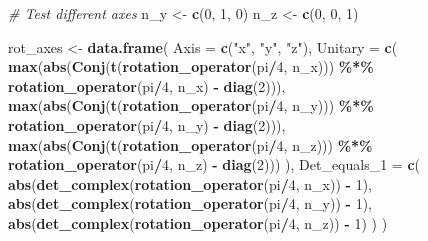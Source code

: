 \documentclass[
]{book}
\newenvironment{Shaded}{\begin{snugshade}}{\end{snugshade}}
\newcommand{\AttributeTok}[1]{\textcolor[rgb]{0.13,0.29,0.53}{#1}}
\newcommand{\CommentTok}[1]{\textcolor[rgb]{0.56,0.35,0.01}{\textit{#1}}}
\newcommand{\DecValTok}[1]{\textcolor[rgb]{0.00,0.00,0.81}{#1}}
\newcommand{\FunctionTok}[1]{\textcolor[rgb]{0.13,0.29,0.53}{\textbf{#1}}}
\newcommand{\NormalTok}[1]{#1}
\newcommand{\OtherTok}[1]{\textcolor[rgb]{0.56,0.35,0.01}{#1}}
\newcommand{\SpecialCharTok}[1]{\textcolor[rgb]{0.81,0.36,0.00}{\textbf{#1}}}
\newcommand{\StringTok}[1]{\textcolor[rgb]{0.31,0.60,0.02}{#1}}
\theoremstyle{definition}
\theoremstyle{definition}
\theoremstyle{definition}
\theoremstyle{definition}
\theoremstyle{remark}
\begin{document}
\begin{Shaded}
\begin{Highlighting}[]
\CommentTok{\# Test different axes}
\NormalTok{n\_y }\OtherTok{\textless{}{-}} \FunctionTok{c}\NormalTok{(}\DecValTok{0}\NormalTok{, }\DecValTok{1}\NormalTok{, }\DecValTok{0}\NormalTok{)}
\NormalTok{n\_z }\OtherTok{\textless{}{-}} \FunctionTok{c}\NormalTok{(}\DecValTok{0}\NormalTok{, }\DecValTok{0}\NormalTok{, }\DecValTok{1}\NormalTok{)}

\NormalTok{rot\_axes }\OtherTok{\textless{}{-}} \FunctionTok{data.frame}\NormalTok{(}
  \AttributeTok{Axis =} \FunctionTok{c}\NormalTok{(}\StringTok{"x"}\NormalTok{, }\StringTok{"y"}\NormalTok{, }\StringTok{"z"}\NormalTok{),}
  \AttributeTok{Unitary =} \FunctionTok{c}\NormalTok{(}
    \FunctionTok{max}\NormalTok{(}\FunctionTok{abs}\NormalTok{(}\FunctionTok{Conj}\NormalTok{(}\FunctionTok{t}\NormalTok{(}\FunctionTok{rotation\_operator}\NormalTok{(pi}\SpecialCharTok{/}\DecValTok{4}\NormalTok{, n\_x))) }\SpecialCharTok{\%*\%} \FunctionTok{rotation\_operator}\NormalTok{(pi}\SpecialCharTok{/}\DecValTok{4}\NormalTok{, n\_x) }\SpecialCharTok{{-}} \FunctionTok{diag}\NormalTok{(}\DecValTok{2}\NormalTok{))),}
    \FunctionTok{max}\NormalTok{(}\FunctionTok{abs}\NormalTok{(}\FunctionTok{Conj}\NormalTok{(}\FunctionTok{t}\NormalTok{(}\FunctionTok{rotation\_operator}\NormalTok{(pi}\SpecialCharTok{/}\DecValTok{4}\NormalTok{, n\_y))) }\SpecialCharTok{\%*\%} \FunctionTok{rotation\_operator}\NormalTok{(pi}\SpecialCharTok{/}\DecValTok{4}\NormalTok{, n\_y) }\SpecialCharTok{{-}} \FunctionTok{diag}\NormalTok{(}\DecValTok{2}\NormalTok{))),}
    \FunctionTok{max}\NormalTok{(}\FunctionTok{abs}\NormalTok{(}\FunctionTok{Conj}\NormalTok{(}\FunctionTok{t}\NormalTok{(}\FunctionTok{rotation\_operator}\NormalTok{(pi}\SpecialCharTok{/}\DecValTok{4}\NormalTok{, n\_z))) }\SpecialCharTok{\%*\%} \FunctionTok{rotation\_operator}\NormalTok{(pi}\SpecialCharTok{/}\DecValTok{4}\NormalTok{, n\_z) }\SpecialCharTok{{-}} \FunctionTok{diag}\NormalTok{(}\DecValTok{2}\NormalTok{)))}
\NormalTok{  ),}
  \AttributeTok{Det\_equals\_1 =} \FunctionTok{c}\NormalTok{(}
    \FunctionTok{abs}\NormalTok{(}\FunctionTok{det\_complex}\NormalTok{(}\FunctionTok{rotation\_operator}\NormalTok{(pi}\SpecialCharTok{/}\DecValTok{4}\NormalTok{, n\_x)) }\SpecialCharTok{{-}} \DecValTok{1}\NormalTok{),}
    \FunctionTok{abs}\NormalTok{(}\FunctionTok{det\_complex}\NormalTok{(}\FunctionTok{rotation\_operator}\NormalTok{(pi}\SpecialCharTok{/}\DecValTok{4}\NormalTok{, n\_y)) }\SpecialCharTok{{-}} \DecValTok{1}\NormalTok{),}
    \FunctionTok{abs}\NormalTok{(}\FunctionTok{det\_complex}\NormalTok{(}\FunctionTok{rotation\_operator}\NormalTok{(pi}\SpecialCharTok{/}\DecValTok{4}\NormalTok{, n\_z)) }\SpecialCharTok{{-}} \DecValTok{1}\NormalTok{)}
\NormalTok{  )}
\NormalTok{)}


\end{Highlighting}
\end{Shaded}
\end{document}
